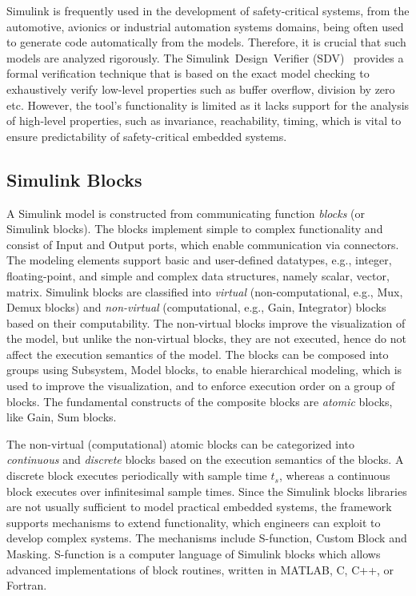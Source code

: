 Simulink is frequently used in the development of safety-critical systems, from the automotive, avionics or industrial automation systems domains, being often used to generate code automatically from the models. Therefore, it is crucial that such models are analyzed rigorously. The Simulink~Design~Verifier (SDV)~\cite{MathWokrksSimulinkVerifier} provides a formal verification technique that is based on the exact model checking to exhaustively verify low-level properties such as buffer overflow, division by zero etc. However, the tool's functionality is limited as it lacks support for the analysis of high-level properties, such as invariance, reachability, timing, which is vital to ensure predictability of safety-critical embedded systems. 

\subsection*{Simulink Blocks}
A Simulink model is constructed from communicating function \textit{blocks} (or Simulink blocks). The blocks implement simple to complex functionality and consist of Input and Output ports, which enable communication via connectors. The modeling elements support basic and user-defined datatypes, e.g., integer, floating-point, and simple and complex data structures, namely scalar, vector, matrix.  Simulink blocks are classified into \textit{virtual} (non-computational, e.g., Mux, Demux blocks) and \textit{non-virtual} (computational, e.g., Gain, Integrator) blocks based on their computability. The non-virtual blocks improve the visualization of the model, but unlike the non-virtual blocks, they are not executed, hence do not affect the execution semantics of the model.  The blocks can be composed into groups using Subsystem, Model blocks, to enable hierarchical modeling, which is used to improve the visualization, and to enforce execution order on a group of blocks. The fundamental constructs of the composite blocks are \textit{atomic} blocks, like Gain, Sum blocks.

The non-virtual (computational) atomic blocks can be categorized into \textit{continuous} and \textit{discrete} blocks based on the execution semantics of the blocks.  A discrete block executes periodically with sample time $t_s$, whereas a continuous block executes over infinitesimal sample times. Since the Simulink blocks libraries are not usually sufficient to model practical embedded systems, the framework supports mechanisms to extend functionality, which engineers can exploit to develop complex systems. The mechanisms include S-function, Custom Block and Masking. S-function is a computer language of Simulink blocks which allows advanced implementations of block routines, written in MATLAB, C, C++, or Fortran.



